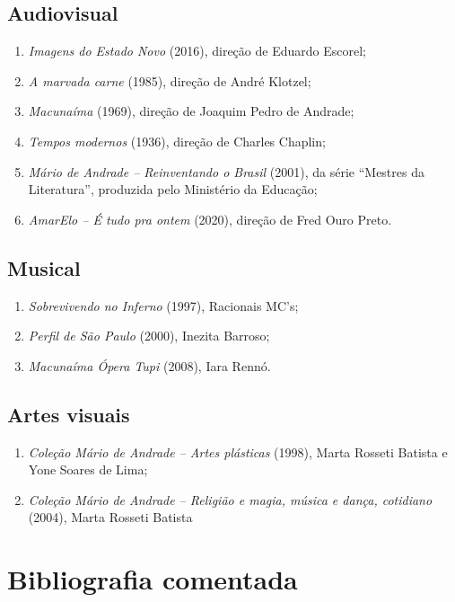 \documentclass[12pt]{extarticle}
\begin{document}
{\subsection{Audiovisual}

\begin{enumerate}
\item
  \emph{Imagens do Estado Novo} (2016), direção de Eduardo Escorel;
\item
  \emph{A marvada carne} (1985), direção de André Klotzel;
\item
  \emph{Macunaíma} (1969), direção de Joaquim Pedro de Andrade;
\item
  \emph{Tempos modernos} (1936), direção de Charles Chaplin;
\item
  \emph{Mário de Andrade -- Reinventando o Brasil} (2001), da série
  ``Mestres da Literatura'', produzida pelo Ministério da Educação;
\item
  \emph{AmarElo -- É tudo pra ontem} (2020), direção de Fred Ouro Preto.
\end{enumerate}

\subsection{Musical}

\begin{enumerate}
\item
  \emph{Sobrevivendo no Inferno} (1997), Racionais MC's;
\item
  \emph{Perfil de São Paulo} (2000), Inezita Barroso;
\item
  \emph{Macunaíma Ópera Tupi} (2008), Iara Rennó.
\end{enumerate}

\subsection{Artes visuais}

\begin{enumerate}
\item
  \emph{Coleção Mário de Andrade -- Artes plásticas} (1998), Marta
  Rosseti Batista e Yone Soares de Lima;
\item
  \emph{Coleção Mário de Andrade -- Religião e magia, música e dança,
  cotidiano} (2004), Marta Rosseti Batista
\end{enumerate}

\section{Bibliografia comentada}

}
\end{document}

